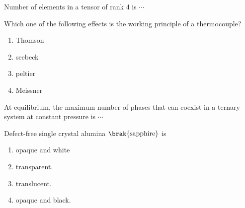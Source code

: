 \bigskip
\item Number of elements in a tensor of rank 4 is $\cdots$
\bigskip
\item Which one of the following effects is the working principle of a thermocouple?
\begin{enumerate}
    \item Thomson
    \item seebeck
    \item peltier
    \item Meissner
\end{enumerate}
\bigskip
\item At equilibrium, the maximum number of phases that can coexist in a ternary system at constant pressure is $\cdots$
\bigskip
\item Defect-free single crystal alumina $\brak{\text{sapphire}}$ is
\begin{enumerate}
    \item opaque and white
    \item transparent.
    \item translucent.
    \item opaque and black.
\end{enumerate}

